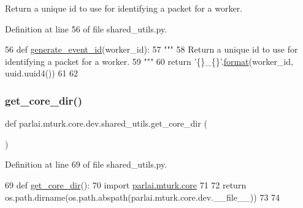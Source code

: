 \begin{DoxyVerb}Return a unique id to use for identifying a packet for a worker.
\end{DoxyVerb}
 

Definition at line 56 of file shared\+\_\+utils.\+py.


\begin{DoxyCode}
56 \textcolor{keyword}{def }\hyperlink{namespaceparlai_1_1mturk_1_1core_1_1shared__utils_aba2e4d48063dafc80e931f8925dbb755}{generate\_event\_id}(worker\_id):
57     \textcolor{stringliteral}{"""}
58 \textcolor{stringliteral}{    Return a unique id to use for identifying a packet for a worker.}
59 \textcolor{stringliteral}{    """}
60     \textcolor{keywordflow}{return} \textcolor{stringliteral}{'\{\}\_\{\}'}.\hyperlink{namespaceparlai_1_1mturk_1_1core_1_1shared__utils_a9cd2c4b48b3efc5296be64d403e00151}{format}(worker\_id, uuid.uuid4())
61 
62 
\end{DoxyCode}
\mbox{\label{namespaceparlai_1_1mturk_1_1core_1_1dev_1_1shared__utils_aead9ab64df5040f7a479ea81deea353c}} 
\subsubsection{\texorpdfstring{get\+\_\+core\+\_\+dir()}{get\_core\_dir()}}
{\footnotesize\ttfamily def parlai.\+mturk.\+core.\+dev.\+shared\+\_\+utils.\+get\+\_\+core\+\_\+dir (\begin{DoxyParamCaption}{ }\end{DoxyParamCaption})}



Definition at line 69 of file shared\+\_\+utils.\+py.


\begin{DoxyCode}
69 \textcolor{keyword}{def }\hyperlink{namespaceparlai_1_1mturk_1_1core_1_1shared__utils_ac4e340ccc66c691fdd294c734dae0c5d}{get\_core\_dir}():
70     \textcolor{keyword}{import} \hyperlink{namespaceparlai_1_1mturk_1_1core}{parlai.mturk.core}
71 
72     \textcolor{keywordflow}{return} os.path.dirname(os.path.abspath(parlai.mturk.core.dev.\_\_file\_\_))
73 
74 
\end{DoxyCode}
\mbox{\label{namespaceparlai_1_1mturk_1_1core_1_1dev_1_1shared__utils_a1a7ab908ecffbfc1fabb5222625d35a2}} 
